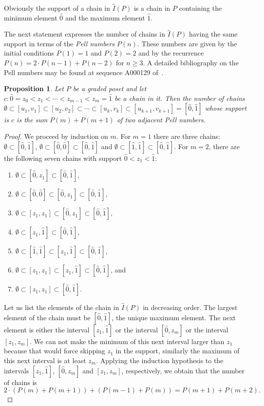 \documentclass[reqno,12pt]{amsart}
\numberwithin{equation}{section}
\newtheorem{proposition}[theorem]{Proposition}
\newcommand{\0}{\widehat{0}}
\newcommand{\1}{\widehat{1}}
\newcommand{\2}{\widehat{2}}
\newcommand{\grI}{\widehat{I}}
\begin{document}
Obviously the support of a chain in $\grI(P)$ is a chain in $P$
containing the minimum element $\0$ and the maximum element $\1$.


The next statement expresses the number of chains in $\grI(P)$ having
the same support in terms of the {\em Pell numbers $P(n)$}. 
These numbers are given by the initial conditions $P(1)=1$
and $P(2)=2$ and by the recurrence $P(n)=2\cdot P(n-1)+P(n-2)$ for
$n\geq 3$. A detailed bibliography on the Pell numbers may be found at sequence
A000129 of~\cite{OEIS}.



\begin{proposition}
\label{prop:pell2}
Let $P$ be a graded poset and let $c: \0=z_0<z_1<\cdots<z_{m-1}<z_{m}=\1$ be
a chain in it. Then the number of chains
$\emptyset\subset [u_1,v_1]\subset [u_2,v_2]\subset \cdots
\subset[u_k,v_k]\subset [u_{k+1},v_{k+1}]=[\0,\1]$ whose support is $c$
is the sum $P(m)+P(m+1)$ of two adjacent Pell numbers. 
\end{proposition}  
\begin{proof}  
We proceed by induction on $m$. For $m=1$ there are three
chains: $\emptyset\subset [\0,\1]$, $\emptyset\subset [\0,\0]\subset
[\0,\1]$ and $\emptyset\subset [\1,\1]\subset [\0,\1]$. 
For $m=2$, there are the following seven chains with support
$\0<z_1<\1$: 
\begin{enumerate}
\item $\emptyset\subset [\0,z_1]\subset [\0,\1]$,
\item $\emptyset\subset [\0,\0]\subset [\0,z_1]\subset [\0,\1]$,
\item $\emptyset\subset [z_1,z_1]\subset [\0,z_1]\subset [\0,\1]$,
\item $\emptyset\subset [z_1,\1]\subset [\0,\1]$,
\item $\emptyset\subset [\1,\1]\subset [z_1,\1]\subset [\0,\1]$,
\item $\emptyset\subset [z_1,z_1]\subset [z_1,\1]\subset [\0,\1]$, and
\item $\emptyset\subset [z_1,z_1]\subset [\0,\1]$. 
\end{enumerate}
Let us list the elements of the chain in $\grI(P)$ in decreasing order.   
The largest element of the chain must be $[\0,\1]$, the
unique maximum element. The next element is either the interval
$[z_1,\1]$ or the interval $[\0,z_m]$ or the interval $[z_1,z_m]$. We
can not make the minimum of this next interval larger than $z_1$ because
that would force skipping $z_1$ in the support, similarly the maximum of
this next interval is at least $z_m$. Applying the induction hypothesis
to the intervals $[z_1,\1]$, $[\0,z_m]$ and $[z_1,z_m]$, respectively,
we obtain that the number of chains is 
$$2\cdot (P(m)+P(m+1))+(P(m-1)+P(m))=P(m+1)+P(m+2).$$
\end{proof}  
\end{document}
